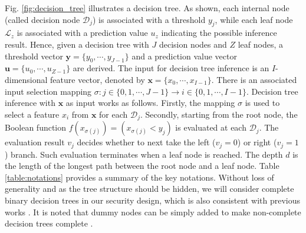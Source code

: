 \documentclass[10pt,journal,compsoc]{IEEEtran}
\begin{document}
Fig. \ref{fig:decision_tree} illustrates a decision tree.
%
As shown, each internal node (called decision node $\mathcal{D}_j$) is associated with a threshold $y_j$, while each leaf node $\mathcal{L}_z$ is associated with a prediction value $u_z$ indicating the possible inference result.
% 
Hence, given a decision tree with $J$ decision nodes and $Z$ leaf nodes, a threshold vector $\mathbf{y}=\{y_0,\cdots, y_{J-1}\}$ and a prediction value vector $\mathbf{u}=\{u_{0},\cdots, u_{Z-1}\}$ are derived.
%
The input for decision tree inference is an $I$-dimensional feature vector, denoted by $\textbf{x}=\{x_{0},\cdots, x_{I-1}\}$.
%
There is an associated input selection mapping $\sigma: j\in \{0, 1,\cdots, J-1\}  \rightarrow i \in \{0,1,\cdots, I-1\}$.
%
Decision tree inference with $\mathbf{x}$ as input works as follows. 
%
Firstly, the mapping $\sigma$ is used to select a feature $x_i$ from $\mathbf{x}$ for each $\mathcal{D}_j$. 
%
Secondly, starting from the root node, the Boolean function $f(x_{\sigma(j)})=(x_{\sigma(j)} < y_j)$ is evaluated at each $\mathcal{D}_j$.
%
The evaluation result $v_j$ decides whether to next take the left ($v_j=0$) or right ($v_j=1$) branch.
%
Such evaluation terminates when a leaf node is reached.
%
The depth $d$ is the length of the longest path between the root node and a leaf node.
%
%
Table \ref{table:notations} provides a summary of the key notations. 
%
Without loss of generality and as the tree structure should be hidden, we will consider complete binary decision trees in our security design, which is also consistent with previous works \cite{DWuFNL16,TaiMZC17,TuenoKK19,Cock17,ZhengDWWN20}.
%
It is noted that dummy nodes can be simply added to make non-complete decision trees complete \cite{DWuFNL16}. 



\end{document}
